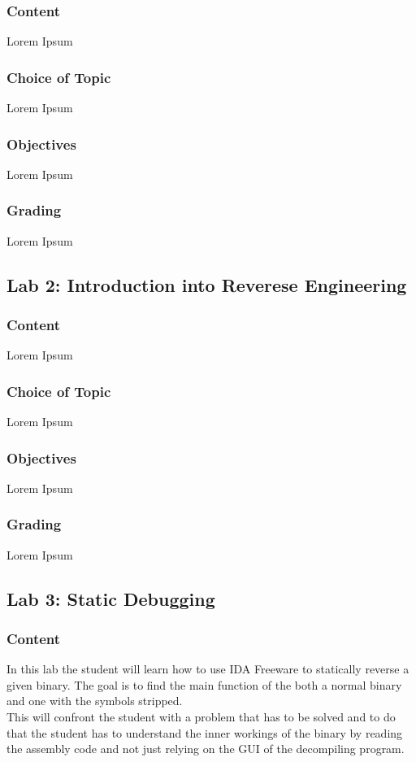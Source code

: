 \subsubsection*{Content}
Lorem Ipsum
\subsubsection*{Choice of Topic}
Lorem Ipsum
\subsubsection*{Objectives}
Lorem Ipsum
\subsubsection*{Grading}
Lorem Ipsum

\subsection{Lab 2: Introduction into Reverese Engineering}
\subsubsection*{Content}
Lorem Ipsum
\subsubsection*{Choice of Topic}
Lorem Ipsum
\subsubsection*{Objectives}
Lorem Ipsum
\subsubsection*{Grading}
Lorem Ipsum

\subsection{Lab 3: Static Debugging}
\subsubsection*{Content}
In this lab the student will learn how to use IDA Freeware to statically reverse a given binary. The goal is to find the main function of the both a normal binary and one with the symbols stripped. \\
This will confront the student with a problem that has to be solved and to do that the student has to understand the inner workings of the binary by reading the assembly code and not just relying on the GUI of the decompiling program.
